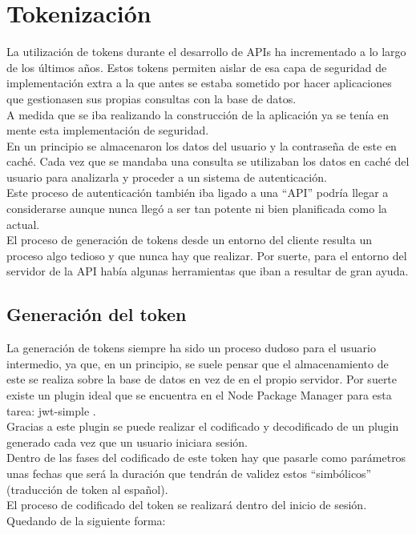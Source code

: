 \section{Tokenización}

La utilización de tokens durante el desarrollo de APIs ha incrementado a lo largo de los últimos años. Estos tokens permiten aislar de esa capa de seguridad de implementación extra a la que antes se estaba sometido por hacer aplicaciones que gestionasen sus propias consultas con la base de datos.
\\A medida que se iba realizando la construcción de la aplicación ya se tenía en mente esta implementación de seguridad.
\\En un principio se almacenaron los datos del usuario y la contraseña de este en caché. Cada vez que se mandaba una consulta se utilizaban los datos en caché del usuario para analizarla y proceder a un sistema de autenticación.
\\Este proceso de autenticación también iba ligado a una ``API'' podría llegar a considerarse aunque nunca llegó a ser tan potente ni bien planificada como la actual.
\\El proceso de generación de tokens desde un entorno del cliente resulta un proceso algo tedioso y que nunca hay que realizar. Por suerte, para el entorno del servidor de la API había algunas herramientas que iban a resultar de gran ayuda.

\subsection{Generación del token}
La generación de tokens siempre ha sido un proceso dudoso para el usuario intermedio, ya que, en un principio, se suele pensar que el almacenamiento de este se realiza sobre la base de datos en vez de en el propio servidor. Por suerte existe un plugin ideal que se encuentra en el Node Package Manager para esta tarea: jwt-simple \cite{node-token}.
\\Gracias a este plugin se puede realizar el codificado y decodificado de un plugin generado cada vez que un usuario iniciara sesión.
\\Dentro de las fases del codificado de este token hay que pasarle como parámetros unas fechas que será la duración que tendrán de validez estos ``simbólicos'' (traducción de token al español).
\\El proceso de codificado del token se realizará dentro del inicio de sesión. Quedando de la siguiente forma:

